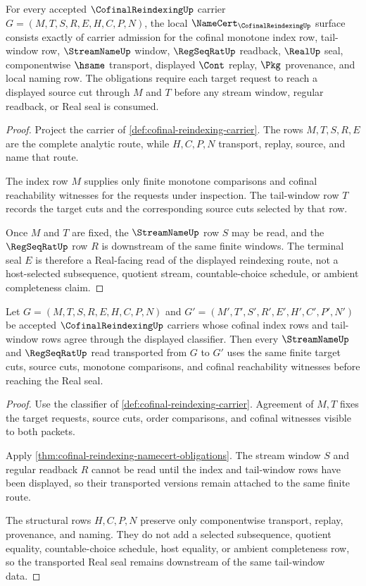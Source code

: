 \begin{theorem}
\label{thm:cofinal-reindexing-namecert-obligations}
For every accepted $\CofinalReindexingUp$ carrier $G=(M,T,S,R,E,H,C,P,N)$, the local $\NameCert_{\CofinalReindexingUp}$ surface consists exactly of carrier admission for the cofinal monotone index row, tail-window row, $\StreamNameUp$ window, $\RegSeqRatUp$ readback, $\RealUp$ seal, componentwise $\hsame$ transport, displayed $\Cont$ replay, $\Pkg$ provenance, and local naming row. The obligations require each target request to reach a displayed source cut through $M$ and $T$ before any stream window, regular readback, or Real seal is consumed.
\end{theorem}
\begin{proof}
Project the carrier of \autoref{def:cofinal-reindexing-carrier}. The rows $M,T,S,R,E$ are the complete analytic route, while $H,C,P,N$ transport, replay, source, and name that route.

The index row $M$ supplies only finite monotone comparisons and cofinal reachability witnesses for the requests under inspection. The tail-window row $T$ records the target cuts and the corresponding source cuts selected by that row.

Once $M$ and $T$ are fixed, the $\StreamNameUp$ row $S$ may be read, and the $\RegSeqRatUp$ row $R$ is downstream of the same finite windows. The terminal seal $E$ is therefore a Real-facing read of the displayed reindexing route, not a host-selected subsequence, quotient stream, countable-choice schedule, or ambient completeness claim.
\end{proof}

\begin{theorem}
\label{thm:cofinal-reindexing-tail-window-stability}
Let $G=(M,T,S,R,E,H,C,P,N)$ and $G'=(M',T',S',R',E',H',C',P',N')$ be accepted $\CofinalReindexingUp$ carriers whose cofinal index rows and tail-window rows agree through the displayed classifier. Then every $\StreamNameUp$ and $\RegSeqRatUp$ read transported from $G$ to $G'$ uses the same finite target cuts, source cuts, monotone comparisons, and cofinal reachability witnesses before reaching the Real seal.
\end{theorem}
\begin{proof}
Use the classifier of \autoref{def:cofinal-reindexing-carrier}. Agreement of $M,T$ fixes the target requests, source cuts, order comparisons, and cofinal witnesses visible to both packets.

Apply \autoref{thm:cofinal-reindexing-namecert-obligations}. The stream window $S$ and regular readback $R$ cannot be read until the index and tail-window rows have been displayed, so their transported versions remain attached to the same finite route.

The structural rows $H,C,P,N$ preserve only componentwise transport, replay, provenance, and naming. They do not add a selected subsequence, quotient equality, countable-choice schedule, host equality, or ambient completeness row, so the transported Real seal remains downstream of the same tail-window data.
\end{proof}

